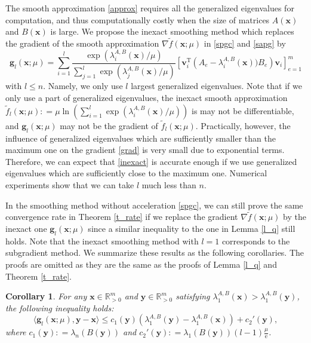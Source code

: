 \documentclass[sn-mathphys,Numbered]{sn-jnl}%
\theoremstyle{thmstyleone}%
\theoremstyle{thmstyletwo}%
\theoremstyle{thmstylethree}%
\newtheorem{corollary}[theorem]{Corollary}
\newcommand{\e}[1]{\begin{equation}#1\end{equation}}
\newcommand{\prn}[1]{\left(#1\right)}
\def\coloneq{\mathrel{\mathop:}=}
\def\tp{\mathrm{T}}
\def\lamx{\lambda^{A,B}_1(\boldsymbol{x})}
\def\lamxi{\lambda^{A,B}_i(\boldsymbol{x})}
\def\lamxj{\lambda^{A,B}_j(\boldsymbol{x})}
\def\lamy{\lambda^{A,B}_1(\boldsymbol{y})}
\begin{document}
The smooth approximation \eqref{approx} requires all the generalized eigenvalues for computation, and thus computationally costly when the size of matrices $A(\bm{x})$ and $B(\bm{x})$ is large. We propose the inexact smoothing method which replaces the gradient of the smooth approximation $\nabla\tilde{f}(\bm{x};\mu)$ in \eqref{spgc} and \eqref{sapg} by
\e{
\bm{g}_l(\bm{x};\mu)= \sum_{i=1}^l \frac{\exp(\lamxi/\mu)}{\sum_{j=1}^l \exp(\lamxj/\mu)}\left[\bm{v}_i^\tp \left(A_e-\lamxi)B_e\right)\bm{v}_i\right]_{e=1}^m
\label{inexact}
}
with $l\le n$. Namely, we only use $l$ largest generalized eigenvalues. Note that if we only use a part of generalized eigenvalues, the inexact smooth approximation $\tilde{f}_l(\bm{x};\mu)\coloneq\mu\ln\prn{\sum_{i=1}^l \exp\prn{\lamxi/\mu}}$ is may not be differentiable, and $\bm{g}_l(\bm{x};\mu)$ may not be the gradient of $\tilde{f}_l(\bm{x};\mu)$. Practically, however, the influence of generalized eigenvalues which are sufficiently smaller than the maximum one on the gradient \eqref{grad} is very small due to exponential terms. Therefore, we can expect that \eqref{inexact} is accurate enough if we use generalized eigenvalues which are sufficiently close to the maximum one. Numerical experiments show that we can take $l$ much less than $n$.

In the smoothing method without acceleration \eqref{spgc}, we can still prove the same convergence rate in Theorem \ref{t_rate} if we replace the gradient $\nabla\tilde{f}(\bm{x};\mu)$ by the inexact one $\bm{g}_l(\bm{x};\mu)$ since a similar inequality to the one in Lemma \ref{l_q} still holds. Note that the inexact smoothing method with $l=1$ corresponds to the subgradient method. We summarize these results as the following corollaries. The proofs are omitted as they are the same as the proofs of Lemma \ref{l_q} and Theorem \ref{t_rate}.

\begin{corollary}
For any $\bm{x}\in\mathbb{R}^m_{>0}$ and $\bm{y}\in\mathbb{R}^m_{>0}$ satisfying $\lamx>\lamy$, the following inequality holds:
\e{
\langle\bm{g}_l(\bm{x};\mu),\bm{y}-\bm{x}\rangle\le c_1(\bm{y})\prn{\lamy-\lamx}+c_2'(\bm{y}),
}
where $c_1(\bm{y})\coloneq\lambda_n(B(\bm{y}))$ and $c_2'(\bm{y})\coloneq\lambda_1(B(\bm{y}))(l-1)\frac{\mu}{\mathrm{e}}$.
\label{c_inexact}
\end{corollary}
\end{document}

